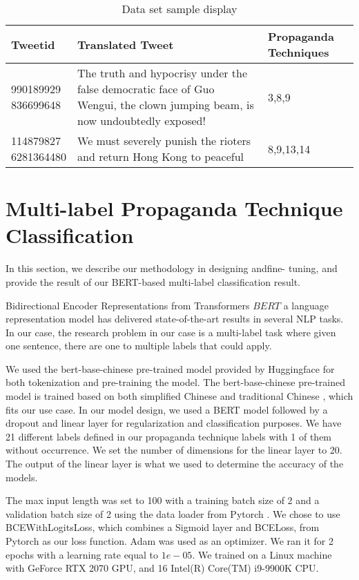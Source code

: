 \documentclass[sigconf]{acmart}
\begin{document}
\begin{table}[ht]
  \caption{Data set sample display}
  \label{tab:smp}
  \begin{tabular}{|p{1.5cm}|p{4cm}|p{1.5cm}|}
    \toprule
    Tweetid & Translated Tweet & Propaganda Techniques\\
    \midrule 
    \shortstack[r]{990189929\\836699648} & The truth and hypocrisy under  the false democratic face of Guo Wengui, the clown jumping beam, is now undoubtedly exposed! & 3,8,9\\
    \hline 
    \shortstack[r]{114879827\\6281364480} & We must severely punish the rioters and return Hong Kong to peaceful & 8,9,13,14\\
  \bottomrule
\end{tabular}
\end{table}

\section{Multi-label Propaganda Technique Classification}
In this section, we describe our methodology in designing andfine- tuning, and provide the result of our BERT-based multi-label classification result.

Bidirectional Encoder Representations from Transformers \(BERT\) \cite{devlin-etal-2019-bert} a language representation model has delivered state-of-the-art results in several NLP tasks. In our case, the research problem in our case is a multi-label task where given one sentence, there are one to multiple labels that could apply. 

We used the bert-base-chinese pre-trained model provided by Huggingface \cite{wolf-etal-2020-transformers} for both tokenization and pre-training the model. The bert-base-chinese pre-trained model is trained based on both simplified Chinese and traditional Chinese \cite{cui2019pre}, which fits our use case. In our model design, we used a BERT model followed by a dropout and linear layer for regularization and classification purposes. We have 21 different labels defined in our propaganda technique labels with 1 of them without occurrence. We set the number of dimensions for the linear layer to 20. The output of the linear layer is what we used to determine the accuracy of the models. 

The max input length was set to 100 with a training batch size of 2 and a validation batch size of 2 using the data loader from Pytorch \cite{NEURIPS2019_9015}. We chose to use BCEWithLogitsLoss, which combines a Sigmoid layer and BCELoss, from Pytorch  \cite{NEURIPS2019_9015} as our loss function. Adam \cite{1412.6980} was used as an optimizer. We ran it for 2 epochs with a learning rate equal to $ 1e-05$. We trained on a Linux machine with GeForce RTX 2070 GPU, and 16 Intel(R) Core(TM) i9-9900K CPU.
\end{document}
